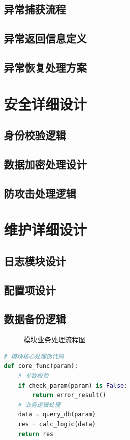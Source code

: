 \documentclass{../template/softeng}
\begin{document}
\subsection{异常捕获流程}
\subsection{异常返回信息定义}
\subsection{异常恢复处理方案}

\section{安全详细设计}
\subsection{身份校验逻辑}
\subsection{数据加密处理设计}
\subsection{防攻击处理逻辑}

\section{维护详细设计}
\subsection{日志模块设计}
\subsection{配置项设计}
\subsection{数据备份逻辑}

\begin{figure}[htbp]
    \centering
    \caption{模块业务处理流程图}
\end{figure}

\begin{lstlisting}[language=Python]
# 模块核心处理伪代码
def core_func(param):
    # 参数校验
    if check_param(param) is False:
        return error_result()
    # 业务逻辑处理
    data = query_db(param)
    res = calc_logic(data)
    return res
\end{lstlisting}
\end{document}
